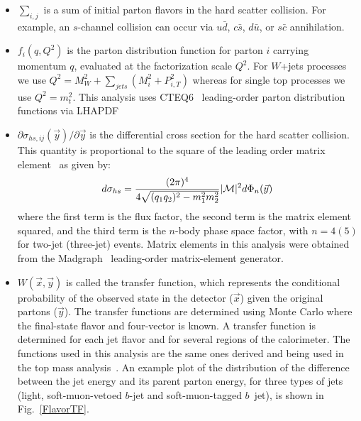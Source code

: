 \begin{itemize}

\item $\sum_{i,j}$ is a sum of initial parton flavors in the hard
scatter collision. For example, an $s$-channel collision can occur via
$u\bar{d}$, $c\bar{s}$, $d\bar{u}$, or $s\bar{c}$ annihilation.

\item $f_{i}(q, Q^{2})$ is the parton distribution function for parton
$i$ carrying momentum $q$,
evaluated at the factorization scale $Q^2$. For $W$+jets processes we
use $Q^2=M_{W}^{2} + \sum_{jets}({M_{i}^2 + P_{i,T}^2})$ whereas for
single top processes we use $Q^2=m_t^2$. This analysis uses
CTEQ6~\cite{Pumplin:2005rh} leading-order parton distribution
functions via LHAPDF~\cite{LHAPDF}

\item $\partial\sigma_{hs,ij}(\vec{y})/\partial\vec{y}$ is the
differential cross section for the hard scatter collision. This
quantity is proportional to the square of the leading order matrix
element~\cite{PDG} as given by:
\begin{equation}
\label{dsigma_hs}
d\sigma_{hs}
= \frac{(2\pi)^4}{4\sqrt{(q_{1}q_{2})^2 - m_{1}^2m_{2}^2}}
|{\cal M}|^{2}
d\Phi_{n}(\vec{y})
\end{equation}
\noindent where the first term is the flux factor, the second term is
the matrix element squared, and the third term is the $n$-body phase
space factor, with $n=4(5)$ for two-jet (three-jet) events. Matrix
elements in this analysis were obtained from the
Madgraph~\cite{Maltoni:2002qb} leading-order matrix-element generator.

\item $W(\vec{x},\vec{y})$ is called the transfer function, which 
represents the conditional probability of the observed state in the
detector ($\vec{x}$) given the original partons ($\vec{y}$). The
transfer functions are determined using Monte Carlo where the
final-state flavor and four-vector is known. A transfer function is
determined for each jet flavor and for several regions of the
calorimeter. The functions used in this analysis are the same ones
derived and being used in the top mass analysis~\cite{JetTF}. An
example plot of the distribution of the difference between the jet
energy and its parent parton energy, for three types of jets (light,
soft-muon-vetoed $b$-jet and soft-muon-tagged $b$~jet), is shown in
Fig.~\ref{FlavorTF}.


\end{itemize}
